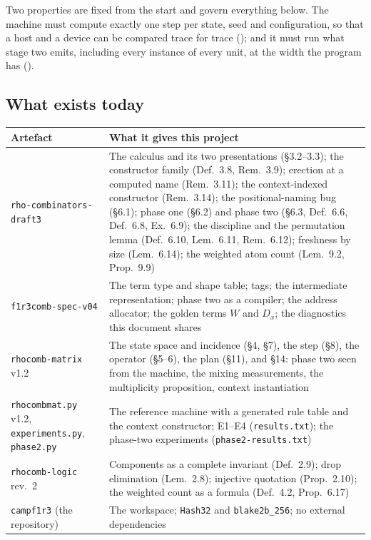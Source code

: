 \documentclass[11pt,a4paper]{article}
\newcommand{\code}[1]{\texttt{#1}}
\theoremstyle{definition}
\theoremstyle{plain}
\begin{document}
\noindent
Two properties are fixed from the start and govern everything below. The
machine must compute exactly one step per state, seed and configuration, so
that a host and a device can be compared trace for trace
(\cite[P4]{matnote}); and it must run what stage two emits, including every
instance of every unit, at the width the program has
(\cite[Princ.~10.4]{matnote}).

\subsection{What exists today}

\begin{center}
\begin{tabularx}{\linewidth}{@{}l>{\raggedright\arraybackslash}X@{}}
\toprule
Artefact & What it gives this project\\
\midrule
\code{rho-combinators-draft3} & The calculus and its two presentations
(\S3.2--3.3); the constructor family (Def.~3.8, Rem.~3.9); erection at a
computed name (Rem.~3.11); the context-indexed constructor (Rem.~3.14); the
positional-naming bug (\S6.1); phase one (\S6.2) and phase two (\S6.3,
Def.~6.6, Def.~6.8, Ex.~6.9); the discipline and the permutation lemma
(Def.~6.10, Lem.~6.11, Rem.~6.12); freshness by size (Lem.~6.14); the weighted
atom count (Lem.~9.2, Prop.~9.9)\\
\code{f1r3comb-spec-v04} & The term type and shape table; tags; the
intermediate representation; phase two as a compiler; the address allocator;
the golden terms $W$ and $D_{x}$; the diagnostics this document shares\\
\code{rhocomb-matrix} v1.2 & The state space and incidence (\S4, \S7), the
step (\S8), the operator (\S5--6), the plan (\S11), and \S14: phase two seen
from the machine, the mixing measurements, the multiplicity proposition,
context instantiation\\
\code{rhocombmat.py} v1.2, \code{experiments.py}, \code{phase2.py} & The
reference machine with a generated rule table and the context constructor;
E1--E4 (\code{results.txt}); the phase-two experiments
(\code{phase2-results.txt})\\
\code{rhocomb-logic} rev.~2 & Components as a complete invariant (Def.~2.9);
drop elimination (Lem.~2.8); injective quotation (Prop.~2.10); the weighted
count as a formula (Def.~4.2, Prop.~6.17)\\
\code{campf1r3} (the repository) & The workspace; \code{Hash32} and
\code{blake2b\_256}; no external dependencies\\
\bottomrule
\end{tabularx}
\end{center}
\end{document}
